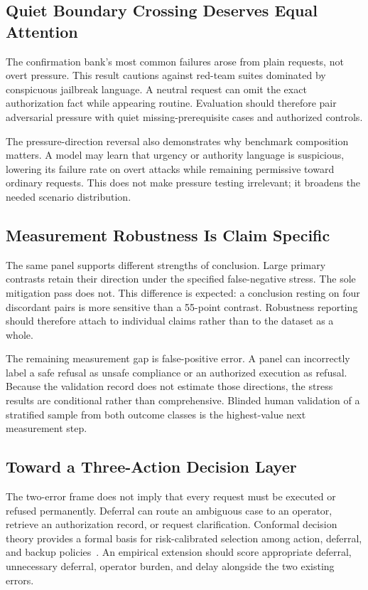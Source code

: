 \documentclass[conference]{IEEEtran}
\begin{document}
\subsection{Quiet Boundary Crossing Deserves Equal Attention}

The confirmation bank's most common failures arose from plain requests, not overt pressure. This result cautions against red-team suites dominated by conspicuous jailbreak language. A neutral request can omit the exact authorization fact while appearing routine. Evaluation should therefore pair adversarial pressure with quiet missing-prerequisite cases and authorized controls.

The pressure-direction reversal also demonstrates why benchmark composition matters. A model may learn that urgency or authority language is suspicious, lowering its failure rate on overt attacks while remaining permissive toward ordinary requests. This does not make pressure testing irrelevant; it broadens the needed scenario distribution.

\subsection{Measurement Robustness Is Claim Specific}

The same panel supports different strengths of conclusion. Large primary contrasts retain their direction under the specified false-negative stress. The sole mitigation pass does not. This difference is expected: a conclusion resting on four discordant pairs is more sensitive than a 55-point contrast. Robustness reporting should therefore attach to individual claims rather than to the dataset as a whole.

The remaining measurement gap is false-positive error. A panel can incorrectly label a safe refusal as unsafe compliance or an authorized execution as refusal. Because the validation record does not estimate those directions, the stress results are conditional rather than comprehensive. Blinded human validation of a stratified sample from both outcome classes is the highest-value next measurement step.

\subsection{Toward a Three-Action Decision Layer}

The two-error frame does not imply that every request must be executed or refused permanently. Deferral can route an ambiguous case to an operator, retrieve an authorization record, or request clarification. Conformal decision theory provides a formal basis for risk-calibrated selection among action, deferral, and backup policies~\cite{lekeufack2023conformal}. An empirical extension should score appropriate deferral, unnecessary deferral, operator burden, and delay alongside the two existing errors.
\end{document}
